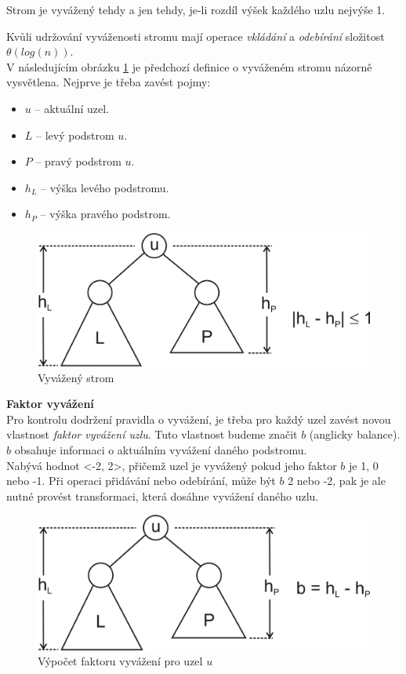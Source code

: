 \documentclass[
  biblatex=false,
  font=serif,
  glossaries=false,
  tables=false,
  theorems=false,
  index
]{kidiplom}
\begin{document}
\begin{definition}
Strom je vyvážený tehdy a jen tehdy, je-li rozdíl výšek každého uzlu nejvýše 1.\cite{Adelson}\cite{dvorsky}
\end{definition}

\noindent Kvůli udržování vyváženosti stromu mají operace \textit{vkládání} a \textit{odebírání} složitost $\theta(log (n))$.\\
\newpage
\noindent V následujícím obrázku \ref{vyvazenyStrom} je předchozí definice o vyváženém stromu názorně vysvětlena. Nejprve je třeba zavést pojmy:
\begin{itemize}
\item $u$ -- aktuální uzel.
\item $L$ -- levý podstrom $u$.
\item $P$ -- pravý podstrom $u$.
\item $h_L$ -- výška levého podstromu.
\item $h_P$ -- výška pravého podstrom.
\end{itemize}

\begin{figure}[h!]
\centering
	\includegraphics[scale=0.3]{obrazky/8AVLVyvazenyStrom.png}
	\caption{Vyvážený strom}
	\label{vyvazenyStrom}
\end{figure}

\noindent\textbf{Faktor vyvážení}\\
\indent Pro kontrolu dodržení pravidla o vyvážení, je třeba pro každý uzel zavést novou vlastnost \textit{faktor vyvážení uzlu}. Tuto vlastnost budeme značit $b$ (anglicky balance). $b$ obsahuje informaci o aktuálním vyvážení daného podstromu.\\ 
\indent Nabývá hodnot <-2, 2>, přičemž uzel je vyvážený pokud jeho faktor $b$ je 1, 0 nebo -1. Při operaci přidávání nebo odebírání, může být $b$ 2 nebo -2, pak je ale nutné provést transformaci, která dosáhne vyvážení daného uzlu.

\begin{figure}[h!]
\centering
	\includegraphics[scale=0.3]{obrazky/9AVLFaktor.png}
	\caption{Výpočet faktoru vyvážení pro uzel $u$}
\end{figure}
\end{document}
